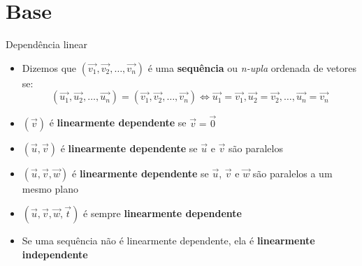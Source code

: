\section{Base}

\begin{frame}{Dependência linear}
    \begin{itemize}
        \item Dizemos que \((\vec{v_1}, \vec{v_2}, \ldots, \vec{v_n})\) é uma \textbf{sequência} ou \textit{n-upla}
            ordenada  de vetores se:
            \[
                (\vec{u_1}, \vec{u_2}, \ldots, \vec{u_n}) = (\vec{v_1}, \vec{v_2}, \ldots, \vec{v_n})
                \Longleftrightarrow \vec{u_1}=\vec{v_1}, \vec{u_2}=\vec{v_2}, \ldots, \vec{u_n}=\vec{v_n}
            \]
            \pause
        \item \((\vec{v})\) é \textbf{linearmente dependente} se \(\vec{v}=\vec{0}\)
        \item \((\vec{u}, \vec{v})\) é \textbf{linearmente dependente} se \(\vec{u}\) e \(\vec{v}\) são paralelos
        \item \((\vec{u}, \vec{v}, \vec{w})\) é  \textbf{linearmente dependente} se \(\vec{u}\), \(\vec{v}\) e \(\vec{w}\) são paralelos a um mesmo plano
        \item \((\vec{u}, \vec{v}, \vec{w}, \vec{t})\) é sempre \textbf{linearmente dependente}
            \pause
        \item Se uma sequência não é linearmente dependente, ela é \textbf{linearmente independente}
    \end{itemize}

\end{frame}

